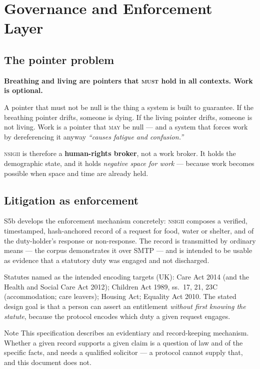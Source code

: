 \documentclass[11pt,a4paper]{article}
\newcommand{\MUST}{\textsc{must}}
\newcommand{\MAY}{\textsc{may}}
\newcommand{\NSIGII}{\textsc{nsigii}}
\begin{document}
\section{Governance and Enforcement Layer}

\subsection{The pointer problem}

\begin{ruleblock}
\textbf{Breathing and living are pointers that \MUST{} hold in all contexts.
Work is optional.}
\end{ruleblock}

A pointer that must not be null is the thing a system is built to guarantee. If
the breathing pointer drifts, someone is dying. If the living pointer drifts,
someone is not living. Work is a pointer that \MAY{} be null --- and a system
that forces work by dereferencing it anyway \emph{``causes fatigue and
confusion.''}

\NSIGII{} is therefore a \textbf{human-rights broker}, not a work broker. It
holds the demographic state, and it holds \emph{negative space for work} ---
because work becomes possible when space and time are already held.

\subsection{Litigation as enforcement}
\label{sec:litigation}

S5b develops the enforcement mechanism concretely: \NSIGII{} composes a
verified, timestamped, hash-anchored record of a request for food, water or
shelter, and of the duty-holder's response or non-response. The record is
transmitted by ordinary means --- the corpus demonstrates it over SMTP --- and
is intended to be usable as evidence that a statutory duty was engaged and not
discharged.

Statutes named as the intended encoding targets (UK): Care Act 2014 (and the
Health and Social Care Act 2012); Children Act 1989, ss.~17, 21, 23C
(accommodation; care leavers); Housing Act; Equality Act 2010. The stated design
goal is that a person can assert an entitlement \emph{without first knowing the
statute}, because the protocol encodes which duty a given request engages.

\begin{errata}{Note}
This specification describes an evidentiary and record-keeping mechanism.
Whether a given record supports a given claim is a question of law and of the
specific facts, and needs a qualified solicitor --- a protocol cannot supply
that, and this document does not.
\end{errata}
\end{document}
